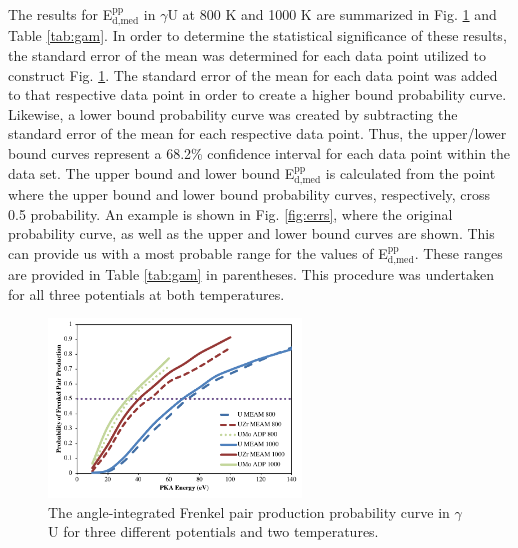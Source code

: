 \documentclass[review]{elsarticle}
\providecommand{\DIFaddbeginFL}{} %
\providecommand{\DIFaddendFL}{} %
\providecommand{\DIFdelbeginFL}{} %
\providecommand{\DIFdelendFL}{} %
\newcommand{\DIFscaledelfig}{0.5}
\newlength{\DIFdelgraphicswidth} %
\newlength{\DIFdelgraphicsheight} %
\newcommand{\DIFaddincludegraphics}[2][]{{\color{blue}\fbox{\DIFOincludegraphics[#1]{#2}}}} %
\newcommand{\DIFdelincludegraphics}[2][]{%
\sbox{\DIFdelgraphicsbox}{\DIFOincludegraphics[#1]{#2}}%
\settoboxwidth{\DIFdelgraphicswidth}{\DIFdelgraphicsbox} %
\settoboxtotalheight{\DIFdelgraphicsheight}{\DIFdelgraphicsbox} %
\scalebox{\DIFscaledelfig}{%
\parbox[b]{\DIFdelgraphicswidth}{\usebox{\DIFdelgraphicsbox}\\[-\baselineskip] \rule{\DIFdelgraphicswidth}{0em}}\llap{\resizebox{\DIFdelgraphicswidth}{\DIFdelgraphicsheight}{%
\setlength{\unitlength}{\DIFdelgraphicswidth}%
\begin{picture}(1,1)%
\thicklines\linethickness{2pt} %
{\color[rgb]{1,0,0}\put(0,0){\framebox(1,1){}}}%
{\color[rgb]{1,0,0}\put(0,0){\line( 1,1){1}}}%
{\color[rgb]{1,0,0}\put(0,1){\line(1,-1){1}}}%
\end{picture}%
}\hspace*{3pt}}} %
} %
\DeclareRobustCommand{\DIFaddbeginFL}{\DIFOaddbeginFL \let\includegraphics\DIFaddincludegraphics} %
\DeclareRobustCommand{\DIFaddendFL}{\DIFOaddendFL \let\includegraphics\DIFOincludegraphics} %
\DeclareRobustCommand{\DIFdelbeginFL}{\DIFOdelbeginFL \let\includegraphics\DIFdelincludegraphics} %
\DeclareRobustCommand{\DIFdelendFL}{\DIFOaddendFL \let\includegraphics\DIFOincludegraphics} %
\begin{document}
The results for E$^{\textrm{pp}}_{\textrm{d,med}}$ in $\gamma$U at 800 K and 1000 K are summarized in Fig. \ref{fig:800_1000} and Table \ref{tab:gam}. In order to determine the statistical significance of these results, the standard error of the mean was determined for each data point utilized to construct Fig. \ref{fig:800_1000}. The standard error of the mean for each data point was added to that respective data point in order to create a higher bound probability curve. Likewise, a lower bound probability curve was created by subtracting the standard error of the mean for each respective data point. Thus, the upper/lower bound curves represent a 68.2\% confidence interval for each data point within the data set. The upper bound and lower bound E$^{\textrm{pp}}_{\textrm{d,med}}$ is calculated from the point where the upper bound and lower bound probability curves, respectively, cross 0.5 probability. An example is shown in Fig. \ref{fig:errs}, where the original probability curve, as well as the upper and lower bound curves are shown. This can provide us with a most probable range for the values of E$^{\textrm{pp}}_{\textrm{d,med}}$. These ranges are provided in Table \ref{tab:gam} in parentheses. This procedure was undertaken for all three potentials at both temperatures.

\begin{figure}[h]
 \centering
 \DIFdelbeginFL %
\DIFdelendFL \DIFaddbeginFL \includegraphics[width=0.6\textwidth]{800_1000A.png} 
 \DIFaddendFL \caption{The angle-integrated Frenkel pair production probability curve in $\gamma$U for three different potentials and two temperatures.}
 \label{fig:800_1000}
\end{figure}
\end{document}
